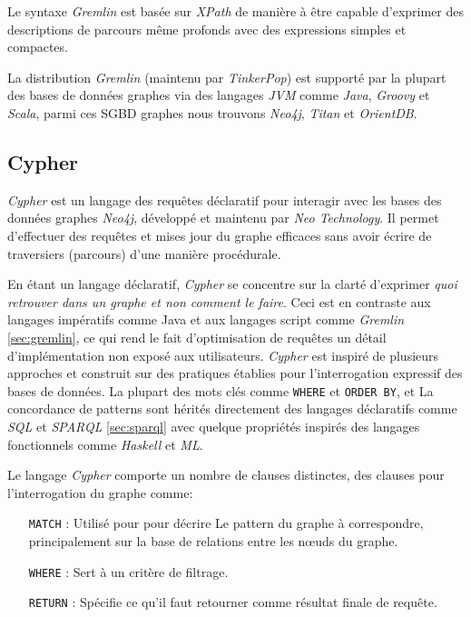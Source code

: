   Le syntaxe \emph{Gremlin} est basée sur \emph{XPath} de manière à
  être capable d'exprimer des descriptions de parcours même profonds
  avec des expressions simples et compactes.\medskip

  La distribution \emph{Gremlin} (maintenu par \emph{TinkerPop}) est
  supporté par la plupart des bases de données graphes via des
  langages \emph{JVM} comme \emph{Java}, \emph{Groovy} et
  \emph{Scala}, parmi ces \acrshort{SGBD} graphes nous trouvons
  \emph{Neo4j}, \emph{Titan} et \emph{OrientDB}.

  \subsection{Cypher}
  \label{sec:cypher}
  \emph{Cypher} \cite{cypher-docs} est un langage des requêtes
  déclaratif pour interagir avec les bases des données graphes
  \emph{Neo4j}, développé et maintenu par \emph{Neo Technology}. Il
  permet d'effectuer des requêtes et mises jour du graphe efficaces
  sans avoir écrire de traversiers (parcours) d'une manière
  procédurale.\medskip

  En étant un langage déclaratif, \emph{Cypher} se concentre sur la
  clarté d'exprimer \textit{quoi retrouver dans un graphe et non
    comment le faire}. Ceci est en contraste aux langages impératifs
  comme Java et aux langages script comme \emph{Gremlin}
  \ref{sec:gremlin}, ce qui rend le fait d'optimisation de requêtes un
  détail d'implémentation non exposé aux utilisateurs. \emph{Cypher}
  est inspiré de plusieurs approches et construit sur des pratiques
  établies pour l'interrogation expressif des bases de données. La
  plupart des mots clés comme \verb|WHERE| et \verb|ORDER BY|, et La
  concordance de patterns sont hérités directement des langages
  déclaratifs comme \emph{SQL} et \emph{SPARQL} \ref{sec:sparql} avec
  quelque propriétés inspirés des langages fonctionnels comme
  \emph{Haskell} et \emph{ML}.\medskip

  Le langage \emph{Cypher} comporte un nombre de clauses distinctes,
  des clauses pour l'interrogation du graphe comme:
  \begin{itemize}
  \item [\texttt{MATCH}]: Utilisé pour pour décrire Le pattern du graphe
    à correspondre, principalement sur la base de relations entre les
    nœuds du graphe.
  \item [\texttt{WHERE}]: Sert à un critère de filtrage.
  \item [\texttt{RETURN}]: Spécifie ce qu'il faut retourner comme
    résultat finale de requête.
  \end{itemize}
  \medskip

